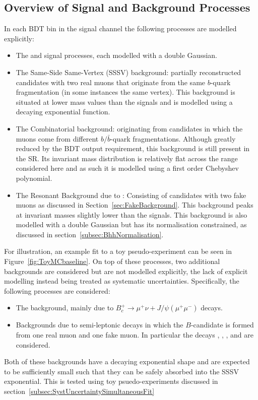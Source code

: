 \subsection{Overview of Signal and Background Processes}
\label{subsec:ProcessSummary}
In each BDT bin in the signal channel the following processes are modelled explicitly:
\begin{itemize}
  \item The \Bsmumu and \Bdmumu signal processes, each modelled with a double Gaussian. 
  \item The Same-Side Same-Vertex (SSSV) background: partially reconstructed candidates with two real muons that originate from the same $b$-quark fragmentation (in some instances the same vertex). This background is situated at lower mass values than the signals and is modelled using a decaying exponential function.   
  \item The Combinatorial background: originating from candidates in which the muons come from different $b/\bar{b}$-quark fragmentations. Although greatly reduced by the BDT output requirement, this background is still present in the SR. Its invariant mass distribution is relatively flat across the range considered here and as such it is modelled using a first order Chebyshev polynomial. 
  \item The Resonant Background due to \Bhh: Consisting of candidates with two fake muons as discussed in Section~\ref{sec:FakeBackground}. This background peaks at invariant masses slightly lower than the \Bmumu signals. This background is also modelled with a double Gaussian but has its normalisation constrained, as discussed in section~\ref{subsec:BhhNormalisation}. 
\end{itemize}

For illustration, an example fit to a toy pseudo-experiment can be seen in Figure~\ref{fig:ToyMCbaseline}.
On top of these processes, two additional backgrounds are considered but are not modelled explicitly, the lack of explicit modelling instead being treated as systematic uncertainties. 
Specifically, the following processes are considered:
\begin{itemize}
  \item The \Bc background, mainly due to $B_c^+\to \mu^{+}\nu + J/\psi(\mu^{+}\mu^{-})$ decays.  
  \item Backgrounds due to semi-leptonic decays in which the $B$-candidate is formed from one real muon and one fake muon. In particular the decays \AntiLPMuNu, \LPMuNu, \BsKmMupNu, and \BdPimMuPNu are considered. 
\end{itemize} 
Both of these backgrounds have a decaying exponential shape and are expected to be sufficiently small such that they can be safely absorbed into the SSSV exponential. 
This is tested using toy psuedo-experiments discussed in section~\ref{subsec:SystUncertaintySimultaneousFit} 



